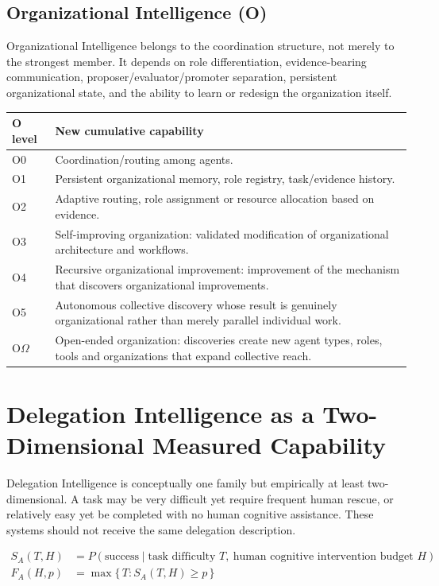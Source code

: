 \documentclass[11pt]{article}
\theoremstyle{definition}
\newcommand{\Om}{\ensuremath{\Omega}}
\newcommand{\SA}{\ensuremath{S_A(T,H)}}
\newcommand{\FA}{\ensuremath{F_A(H,p)}}
\begin{document}
\subsection{Organizational Intelligence (O)}

Organizational Intelligence belongs to the coordination structure, not merely to the strongest member. It depends on role differentiation, evidence-bearing communication, proposer/evaluator/promoter separation, persistent organizational state, and the ability to learn or redesign the organization itself.

\begin{table}[h]
\centering\small
\begin{tabularx}{\textwidth}{@{}lY@{}}
\toprule
O level & New cumulative capability \\
\midrule
O0 & Coordination/routing among agents. \\
O1 & Persistent organizational memory, role registry, task/evidence history. \\
O2 & Adaptive routing, role assignment or resource allocation based on evidence. \\
O3 & Self-improving organization: validated modification of organizational architecture and workflows. \\
O4 & Recursive organizational improvement: improvement of the mechanism that discovers organizational improvements. \\
O5 & Autonomous collective discovery whose result is genuinely organizational rather than merely parallel individual work. \\
O\Om{} & Open-ended organization: discoveries create new agent types, roles, tools and organizations that expand collective reach. \\
\bottomrule
\end{tabularx}
\end{table}

\section{Delegation Intelligence as a Two-Dimensional Measured Capability}

Delegation Intelligence is conceptually one family but empirically at least two-dimensional. A task may be very difficult yet require frequent human rescue, or relatively easy yet be completed with no human cognitive assistance. These systems should not receive the same delegation description.

\begin{align}
\SA{} &= P(\text{success} \mid \text{task difficulty } T,\ \text{human cognitive intervention budget } H)\\
\FA{} &= \max\{\,T : \SA{} \ge p\,\}
\end{align}
\end{document}
